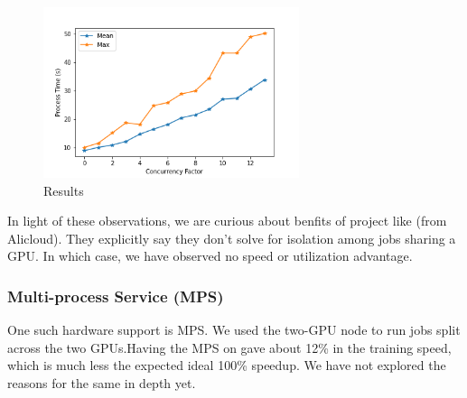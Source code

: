 \begin{figure}[htbp]
\centerline{\includegraphics[height=5cm]{figures/graph.png}}
\caption{Results}
\label{fig5}
\end{figure}

In light of these observations, we are curious about benfits of project like \cite{ali} (from Alicloud). They explicitly say they don't solve for isolation among jobs sharing a GPU. In which case, we have observed no speed or utilization advantage.

\subsubsection{Multi-process Service (MPS)}
One such hardware support is MPS. We used the two-GPU node to run jobs split across the two GPUs.Having the MPS on gave about 12\% in the training speed, which is much less the expected ideal 100\% speedup. We have not explored the reasons for the same in depth yet. \\


%
